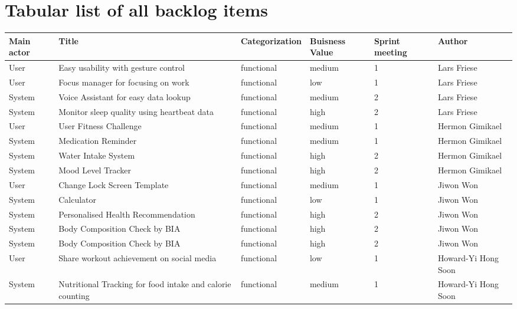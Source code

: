 \documentclass{article}
\begin{document}
\section{Tabular list of all backlog items}
\begin{center}
	\small
	\vspace{0.5cm}
	\begin{tabularx}{\textwidth}{|p{}|X|p{}|p{}|p{}|p{}|}
		\hline
		\textbf{Main actor} & \textbf{Title} & \textbf{Categorization} & \textbf{Buisness Value} & \textbf{Sprint meeting} & \textbf{Author} \\
		\hline
		User & Easy usability with gesture control & functional & medium & 1 & Lars Friese \\ \hline
		User & Focus manager for focusing on work & functional & low & 1 & Lars Friese \\ \hline
		System & Voice Assistant for easy data lookup & functional & medium & 2 & Lars Friese \\ \hline
		System & Monitor sleep quality using heartbeat data & functional & high & 2 & Lars Friese \\ \hline
        User & User Fitness Challenge & functional & medium & 1 & Hermon Gimikael \\ \hline
		System & Medication Reminder & functional & medium & 1 & Hermon Gimikael \\ \hline
		System & Water Intake System & functional & high & 2 & Hermon Gimikael \\ \hline
		System & Mood Level Tracker & functional & high & 2 & Hermon Gimikael \\ \hline
		User & Change Lock Screen Template & functional & medium &  1 & Jiwon Won \\ \hline
		System & Calculator & functional & low &  1 & Jiwon Won \\ \hline
		System & Personalised Health Recommendation & functional & high &  2 & Jiwon Won \\ \hline 
		System & Body Composition Check by BIA & functional & high &  2 & Jiwon Won \\ \hline
		System & Body Composition Check by BIA & functional & high &  2 & Jiwon Won \\ \hline
        User & Share workout achievement on social media & functional & low & 1 & Howard-Yi Hong Soon \\ \hline
        System & Nutritional Tracking for food intake and calorie counting & functional & medium & 1 & Howard-Yi Hong Soon \\ \hline

\end{tabularx}
\end{center}
\end{document}
